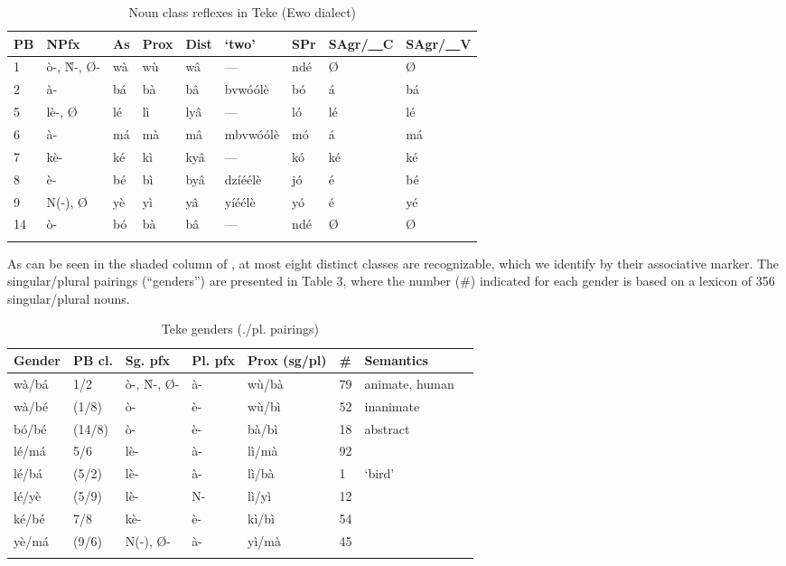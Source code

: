 \documentclass[output=paper,,modfonts,nonflat]{langsci/langscibook}
\begin{document}
\begin{table}[!htbp]
\caption{\small{Noun class reflexes in Teke (Ewo dialect)}}
\label{table2}
\begin{small}
\begin{tabular}{l		l		l		l		l		l		l		l		l		}
  \lsptoprule
PB	&	NPfx	&	\cellcolor{gray!60}As	&	Prox	&	Dist	&	`two’	&	SPr	&	SAgr/\underline{~~}C	&	SAgr/\underline{~~}V	\\	
\midrule
1	&	ò-, Ǹ-, Ø-	&	\cellcolor{gray!60}wà	&	wù	&	wâ	&	---	&	ndé	&	Ø	&	Ø	\\	
2	&	à-	&	\cellcolor{gray!60}bá	&	bà	&	bâ	&	bvwóólè	&	bó	&	á	&	bá	\\	
5	&	lè-, Ø	&	\cellcolor{gray!60}lé	&	lì	&	lyâ	&	---	&	ló	&	lé	&	lé	\\	
6	&	à-	&	\cellcolor{gray!60}má	&	mà	&	mâ	&	mbvwóólè	&	mó	&	á	&	má	\\	
7	&	kè-	&	\cellcolor{gray!60}ké	&	kì	&	kyâ	&	---	&	kó	&	ké	&	ké	\\	
8	&	è-	&	\cellcolor{gray!60}bé	&	bì	&	byâ	&	dzíéélè	&	jó	&	é	&	bé	\\	
9	&	N(-), Ø	&	\cellcolor{gray!60}yè	&	yì	&	yâ	&	yíéélè	&	yó	&	é	&	yé	\\	
14	&	ò-	&	\cellcolor{gray!60}bó	&	bà	&	bâ	&	---	&	ndé	&	Ø	&	Ø	\\
  \lspbottomrule
\end{tabular}
\end{small}
\end{table}

As can be seen in the shaded column of , at most eight distinct classes are recognizable, which we identify by their associative marker. The singular/plural pairings (“genders”) are presented in Table 3, where the number (\#) indicated for each gender is based on a lexicon of 356 singular/plural nouns.

\begin{table}[!htbp]
\caption{Teke genders (./pl. pairings)}
\label{table3}
\begin{small}
\begin{tabular}{l		l		l		l		l		l		l		l		}
  \lsptoprule
Gender	&	PB cl.	&	Sg. pfx	&	Pl. pfx	&	Prox (sg/pl)	&	\#	&	Semantics	\\	
\midrule
wà/bá	&	1/2	&	ò-, Ǹ-, Ø-	&	  à-	&	wù/bà	&	79	&	animate, human	\\	
wà/bé	&	(1/8)	&	ò-	&	  è-	&	wù/bì	&	52	&	inanimate	\\	
bó/bé	&	(14/8)	&	ò-	&	  è-	&	bà/bì	&	18	&	abstract	\\	
lé/má	&	5/6	&	lè-	&	  à-	&	lì/mà	&	92	&		\\	
lé/bá	&	(5/2)	&	lè-	&	  à-	&	lì/bà	&	1	&	`bird’ 	\\	
lé/yè	&	(5/9)	&	lè-	&	  N-	&	lì/yì	&	12	&		\\	
ké/bé	&	7/8	&	kè-	&	  è-	&	kì/bì	&	54	&		\\	
yè/má	&	(9/6)	&	N(-), Ø-	&	  à-	&	yì/mà	&	45	&		\\	
  \lspbottomrule
\end{tabular}
\end{small}
\end{table}
\end{document}
